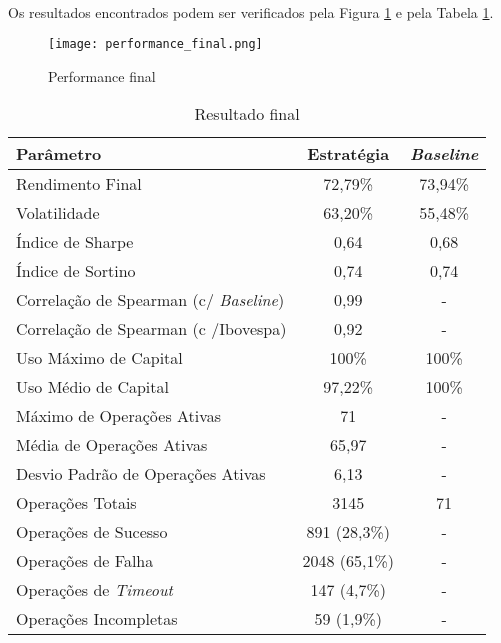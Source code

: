 \paragraph{} Os resultados encontrados podem ser verificados pela Figura \ref{fig:250} e pela Tabela \ref{tab:13}.

\begin{figure}[!htb]
    \texttt{[image: performance\_final.png]}
    \centering
    \caption{Performance final}
    \label{fig:250}
\end{figure}

\begin{table}[h!] %
    \begin{center}
        \begin{tabular}{ l|c|c }
            Parâmetro & Estratégia & \textit{Baseline} \\
            \hline
            Rendimento Final & 72,79\% & 73,94\% \\
            Volatilidade & 63,20\% & 55,48\% \\
            Índice de Sharpe & 0,64 & 0,68 \\
            Índice de Sortino & 0,74 & 0,74 \\
            Correlação de Spearman (c/ \textit{Baseline}) & 0,99 & - \\
            Correlação de Spearman (c /Ibovespa) & 0,92 & - \\
            Uso Máximo de Capital & 100\% & 100\% \\
            Uso Médio de Capital & 97,22\% & 100\% \\
            Máximo de Operações Ativas & 71 & - \\
            Média de Operações Ativas & 65,97 & - \\
            Desvio Padrão de Operações Ativas & 6,13 & -\\
            Operações Totais & 3145 & 71 \\
            Operações de Sucesso & 891 (28,3\%) & - \\
            Operações de Falha & 2048 (65,1\%) & - \\
            Operações de \textit{Timeout} & 147 (4,7\%) & - \\
            Operações Incompletas & 59 (1,9\%) & - \\
        \end{tabular}
        \caption{Resultado final}
        \label{tab:13}
    \end{center}
\end{table}

